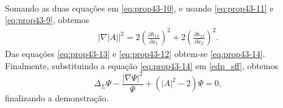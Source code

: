 \begin{demonstracao}
\begin{eqnarray}
\begin{aligned}
\end{aligned}
\end{eqnarray}	
Somando as duas equa\c c\~oes em \eqref{eq:prop43-10}, e usando
\eqref{eq:prop43-11} e \eqref{eq:prop43-9}, obtemos
\begin{eqnarray} \label{eq:prop43-12}
| \nabla |A| |^2 = 2 \left( \frac{\partial h_{12}}{\partial x_1} \right)^2 + 2 \left( \frac{\partial h_{12}}{\partial x_2} \right)^2.
\end{eqnarray}	
Das equa\c c\~oes \eqref{eq:prop43-13} e \eqref{eq:prop43-12}
obtem-se \eqref{eq:prop43-14}. Finalmente, substituindo a
equa\c c\~ao \eqref{eq:prop43-14} em \eqref{edp_sff}, obtemos
\begin{equation*}
\Delta_\Sigma \Psi - \frac{|\nabla \Psi|^2}{\Psi} + (|A|^2 - 2) \Psi = 0,
\end{equation*}
finalizando a demonstra\c c\~ao.
\end{demonstracao}



